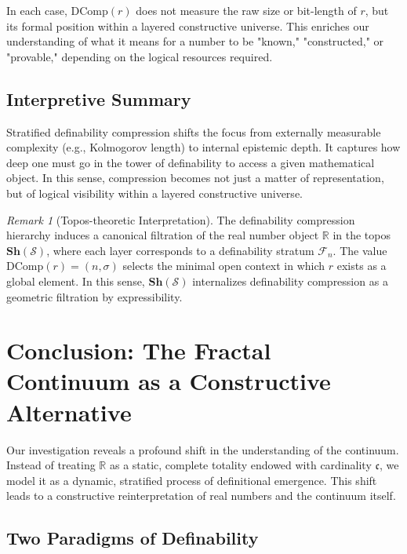 \documentclass[12pt]{article}
\theoremstyle{definition}
\theoremstyle{plain}
\theoremstyle{remark}
\newtheorem*{remark}{Remark}
\begin{document}
In each case, \( \mathrm{DComp}(r) \) does not measure the raw size or bit-length of \( r \), but its formal position within a layered constructive universe. This enriches our understanding of what it means for a number to be "known," "constructed," or "provable," depending on the logical resources required.

\subsection*{Interpretive Summary}

Stratified definability compression shifts the focus from externally measurable complexity (e.g., Kolmogorov length) to internal epistemic depth. It captures how deep one must go in the tower of definability to access a given mathematical object. In this sense, compression becomes not just a matter of representation, but of logical visibility within a layered constructive universe.

\begin{remark}[Topos-theoretic Interpretation]
The definability compression hierarchy induces a canonical filtration of the real number object \( \mathbb{R} \) in the topos \( \mathbf{Sh}(\mathcal{S}) \), where each layer corresponds to a definability stratum \( \mathcal{F}_n \). The value \( \mathrm{DComp}(r) = (n, \sigma) \) selects the minimal open context in which \( r \) exists as a global element. In this sense, \( \mathbf{Sh}(\mathcal{S}) \) internalizes definability compression as a geometric filtration by expressibility.
\end{remark}

\section{Conclusion: The Fractal Continuum as a Constructive Alternative}

Our investigation reveals a profound shift in the understanding of the continuum. Instead of treating \( \mathbb{R} \) as a static, complete totality endowed with cardinality \( \mathfrak{c} \), we model it as a dynamic, stratified process of definitional emergence. This shift leads to a constructive reinterpretation of real numbers and the continuum itself.

\subsection*{Two Paradigms of Definability}
\end{document}
